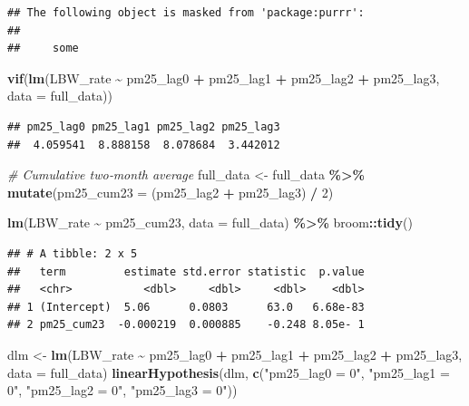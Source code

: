 \documentclass[
]{article}
\newenvironment{Shaded}{\begin{snugshade}}{\end{snugshade}}
\newcommand{\AttributeTok}[1]{\textcolor[rgb]{0.13,0.29,0.53}{#1}}
\newcommand{\CommentTok}[1]{\textcolor[rgb]{0.56,0.35,0.01}{\textit{#1}}}
\newcommand{\DecValTok}[1]{\textcolor[rgb]{0.00,0.00,0.81}{#1}}
\newcommand{\FunctionTok}[1]{\textcolor[rgb]{0.13,0.29,0.53}{\textbf{#1}}}
\newcommand{\NormalTok}[1]{#1}
\newcommand{\OtherTok}[1]{\textcolor[rgb]{0.56,0.35,0.01}{#1}}
\newcommand{\SpecialCharTok}[1]{\textcolor[rgb]{0.81,0.36,0.00}{\textbf{#1}}}
\newcommand{\StringTok}[1]{\textcolor[rgb]{0.31,0.60,0.02}{#1}}
\begin{document}
\begin{verbatim}
## The following object is masked from 'package:purrr':
## 
##     some
\end{verbatim}

\begin{Shaded}
\begin{Highlighting}[]
\FunctionTok{vif}\NormalTok{(}\FunctionTok{lm}\NormalTok{(LBW\_rate }\SpecialCharTok{\textasciitilde{}}\NormalTok{ pm25\_lag0 }\SpecialCharTok{+}\NormalTok{ pm25\_lag1 }\SpecialCharTok{+}\NormalTok{ pm25\_lag2 }\SpecialCharTok{+}\NormalTok{ pm25\_lag3,}
       \AttributeTok{data =}\NormalTok{ full\_data))}
\end{Highlighting}
\end{Shaded}

\begin{verbatim}
## pm25_lag0 pm25_lag1 pm25_lag2 pm25_lag3 
##  4.059541  8.888158  8.078684  3.442012
\end{verbatim}

\begin{Shaded}
\begin{Highlighting}[]
\CommentTok{\# Cumulative two‐month average}
\NormalTok{full\_data }\OtherTok{\textless{}{-}}\NormalTok{ full\_data }\SpecialCharTok{\%\textgreater{}\%}
  \FunctionTok{mutate}\NormalTok{(}\AttributeTok{pm25\_cum23 =}\NormalTok{ (pm25\_lag2 }\SpecialCharTok{+}\NormalTok{ pm25\_lag3) }\SpecialCharTok{/} \DecValTok{2}\NormalTok{)}

\FunctionTok{lm}\NormalTok{(LBW\_rate }\SpecialCharTok{\textasciitilde{}}\NormalTok{ pm25\_cum23, }\AttributeTok{data =}\NormalTok{ full\_data) }\SpecialCharTok{\%\textgreater{}\%}\NormalTok{ broom}\SpecialCharTok{::}\FunctionTok{tidy}\NormalTok{()}
\end{Highlighting}
\end{Shaded}

\begin{verbatim}
## # A tibble: 2 x 5
##   term         estimate std.error statistic  p.value
##   <chr>           <dbl>     <dbl>     <dbl>    <dbl>
## 1 (Intercept)  5.06      0.0803      63.0   6.68e-83
## 2 pm25_cum23  -0.000219  0.000885    -0.248 8.05e- 1
\end{verbatim}

\begin{Shaded}
\begin{Highlighting}[]
\NormalTok{dlm }\OtherTok{\textless{}{-}} \FunctionTok{lm}\NormalTok{(LBW\_rate }\SpecialCharTok{\textasciitilde{}}\NormalTok{ pm25\_lag0 }\SpecialCharTok{+}\NormalTok{ pm25\_lag1 }\SpecialCharTok{+}\NormalTok{ pm25\_lag2 }\SpecialCharTok{+}\NormalTok{ pm25\_lag3,}
          \AttributeTok{data =}\NormalTok{ full\_data)}
\FunctionTok{linearHypothesis}\NormalTok{(dlm, }\FunctionTok{c}\NormalTok{(}\StringTok{"pm25\_lag0 = 0"}\NormalTok{,}
                        \StringTok{"pm25\_lag1 = 0"}\NormalTok{,}
                        \StringTok{"pm25\_lag2 = 0"}\NormalTok{,}
                        \StringTok{"pm25\_lag3 = 0"}\NormalTok{))}
\end{Highlighting}
\end{Shaded}
\end{document}
